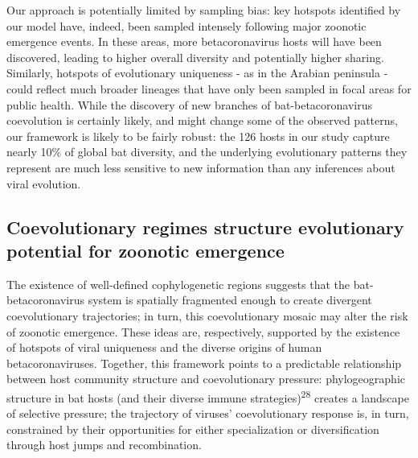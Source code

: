 \documentclass[10pt,oneside]{article}
\begin{document}
Our approach is potentially limited by sampling bias: key hotspots
identified by our model have, indeed, been sampled intensely following
major zoonotic emergence events. In these areas, more betacoronavirus
hosts will have been discovered, leading to higher overall diversity and
potentially higher sharing. Similarly, hotspots of evolutionary
uniqueness - as in the Arabian peninsula - could reflect much broader
lineages that have only been sampled in focal areas for public health.
While the discovery of new branches of bat-betacoronavirus coevolution
is certainly likely, and might change some of the observed patterns, our
framework is likely to be fairly robust: the 126 hosts in our study
capture nearly 10\% of global bat diversity, and the underlying
evolutionary patterns they represent are much less sensitive to new
information than any inferences about viral evolution.

\hypertarget{coevolutionary-regimes-structure-evolutionary-potential-for-zoonotic-emergence}{%
\subsection{Coevolutionary regimes structure evolutionary potential for
zoonotic
emergence}\label{coevolutionary-regimes-structure-evolutionary-potential-for-zoonotic-emergence}}

The existence of well-defined cophylogenetic regions suggests that the
bat-betacoronavirus system is spatially fragmented enough to create
divergent coevolutionary trajectories; in turn, this coevolutionary
mosaic may alter the risk of zoonotic emergence. These ideas are,
respectively, supported by the existence of hotspots of viral uniqueness
and the diverse origins of human betacoronaviruses. Together, this
framework points to a predictable relationship between host community
structure and coevolutionary pressure: phylogeographic structure in bat
hosts (and their diverse immune strategies)\textsuperscript{28} creates
a landscape of selective pressure; the trajectory of viruses'
coevolutionary response is, in turn, constrained by their opportunities
for either specialization or diversification through host jumps and
recombination.
\end{document}
